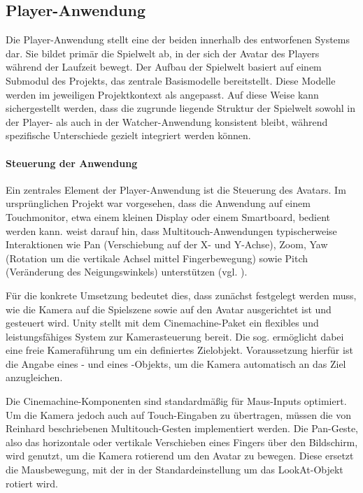 \subsection{Player-Anwendung}

Die Player-Anwendung stellt eine der beiden  innerhalb des entworfenen Systems dar. Sie bildet primär die Spielwelt ab, in der sich der Avatar des Players während der Laufzeit bewegt. Der Aufbau der Spielwelt basiert auf einem Submodul des Projekts, das zentrale Basismodelle bereitstellt. Diese Modelle werden im jeweiligen Projektkontext als  angepasst. Auf diese Weise kann sichergestellt werden, dass die zugrunde liegende Struktur der Spielwelt sowohl in der Player- als auch in der Watcher-Anwendung konsistent bleibt, während spezifische Unterschiede gezielt integriert werden können.

\paragraph{Steuerung der Anwendung}

Ein zentrales Element der Player-Anwendung ist die Steuerung des Avatars. Im ursprünglichen Projekt war vorgesehen, dass die Anwendung auf einem Touchmonitor, etwa einem kleinen Display oder einem Smartboard, bedient werden kann. \cite{reinhard_augmented_2022} weist darauf hin, dass Multitouch-Anwendungen typischerweise Interaktionen wie Pan (Verschiebung auf der X- und Y-Achse), Zoom, Yaw (Rotation um die vertikale Achsel mittel Fingerbewegung) sowie Pitch (Veränderung des Neigungswinkels) unterstützen (vgl. \citealp[S. 66ff]{reinhard_augmented_2022}).

Für die konkrete Umsetzung bedeutet dies, dass zunächst festgelegt werden muss, wie die Kamera auf die Spielszene sowie auf den Avatar ausgerichtet ist und gesteuert wird. Unity stellt mit dem Cinemachine-Paket ein flexibles und leistungsfähiges System zur Kamerasteuerung bereit. Die sog.  ermöglicht dabei eine freie Kameraführung um ein definiertes Zielobjekt. Voraussetzung hierfür ist die Angabe eines - und eines -Objekts, um die Kamera automatisch an das Ziel anzugleichen.

Die Cinemachine-Komponenten sind standardmäßig für Maus-Inputs optimiert. Um die Kamera jedoch auch auf Touch-Eingaben zu übertragen, müssen die von Reinhard beschriebenen Multitouch-Gesten implementiert werden. Die Pan-Geste, also das horizontale oder vertikale Verschieben eines Fingers über den Bildschirm, wird genutzt, um die Kamera rotierend um den Avatar zu bewegen. Diese ersetzt die Mausbewegung, mit der in der Standardeinstellung um das LookAt-Objekt rotiert wird.

